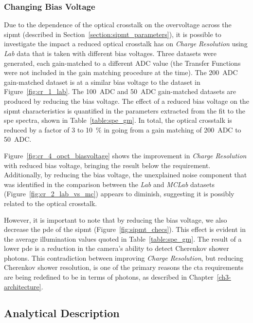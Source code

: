 \subsubsection{Changing Bias Voltage}

Due to the dependence of the optical crosstalk on the overvoltage across the \gls{sipmt} (described in Section~\ref{section:sipmt_parameters}), it is possible to investigate the impact a reduced optical crosstalk has on \textit{Charge Resolution} using \textit{Lab} data that is taken with different bias voltages. Three datasets were generated, each gain-matched to a different ADC value (the Transfer Functions were not included in the gain matching procedure at the time). The \SI{200}{ADC} gain-matched dataset is at a similar bias voltage to the dataset in Figure~\ref{fig:cr_1_lab}. The \SI{100}{ADC} and \SI{50}{ADC} gain-matched datasets are produced by reducing the bias voltage. The effect of a reduced bias voltage on the \gls{sipmt} characteristics is quantified in the parameters extracted from the fit to the \gls{spe} spectra, shown in Table~\ref{table:spe_gm}. In total, the optical crosstalk is reduced by a factor of 3 to \SI{10}{\percent} in going from a gain matching of \SI{200}{ADC} to \SI{50}{ADC}.

Figure~\ref{fig:cr_4_opct_biasvoltage} shows the improvement in \textit{Charge Resolution} with reduced bias voltage, bringing the result below the requirement. Additionally, by reducing the bias voltage, the unexplained noise component that was identified in the comparison between the \textit{Lab} and \textit{MCLab} datasets (Figure~\ref{fig:cr_2_lab_vs_mc}) appears to diminish, suggesting it is possibly related to the optical crosstalk.

However, it is important to note that by reducing the bias voltage, we also decrease the \gls{pde} of the \gls{sipmt} (Figure~\ref{fig:sipmt_checs}). This effect is evident in the average illumination values quoted in Table~\ref{table:spe_gm}. The result of a lower \gls{pde} is a reduction in the camera's ability to detect Cherenkov shower photons. This contradiction between improving \textit{Charge Resolution}, but reducing Cherenkov shower resolution, is one of the primary reasons the \gls{cta} requirements are being redefined to be in terms of photons, as described in Chapter~\ref{ch3-architecture}.

\subsection{Analytical Description}

